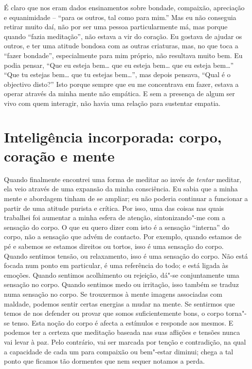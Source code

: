 É claro que nos eram dados ensinamentos sobre bondade, compaixão,
apreciação e equanimidade -- “para os outros, tal como para mim.” Mas eu
não conseguia retirar muito daí, não por ser uma pessoa particularmente
má, mas porque quando “fazia meditação”, não estava a vir do coração. Eu
gostava de ajudar os outros, e ter uma atitude bondosa com as outras
criaturas, mas, no que toca a “fazer bondade”, especialmente para mim
próprio, não resultava muito bem. Eu podia pensar, “Que eu esteja bem\ldots{}
que eu esteja bem\ldots{} que eu esteja bem\ldots{}” “Que tu estejas bem\ldots{} que tu
estejas bem\ldots{}”, mas depois pensava, “Qual é o objectivo disto?” Isto
porque sempre que eu me concentrava em fazer, estava a operar através da
minha mente não empática. E sem a presença de algum ser vivo com quem
interagir, não havia uma relação para sustentar empatia.

\section{Inteligência incorporada: corpo, coração e
mente}

Quando finalmente encontrei uma forma de meditar ao invés de
\emph{tentar} meditar, ela veio através de uma expansão da minha
consciência. Eu sabia que a minha mente e abordagem tinham de se
ampliar; eu não poderia continuar a funcionar a partir de uma atitude
purista e crítica. Por isso, uma das coisas nas quais trabalhei foi
aumentar a minha esfera de atenção, sintonizando"-me com a sensação do
corpo. O que eu quero dizer com isto é a sensação “interna” do corpo,
não a sensação que advém de contacto. Por exemplo, quando estamos de pé
e sabemos se estamos direitos ou tortos, isso é uma sensação do corpo.
Quando sentimos tensão, ou relaxamento, isso é uma sensação do corpo.
Não está focada num ponto em particular, é uma referência do todo; e
está ligada às emoções. Quando sentimos acolhimento ou rejeição, dá"-se
conjuntamente uma sensação no corpo. Quando sentimos medo ou irritação,
isso também se traduz numa sensação no corpo. Se trouxermos à mente
imagens associadas com maldade, podemos sentir certas energias a mudar
na mente. Se sentirmos que temos de nos defender ou provar que somos
suficientemente bons, o corpo torna"-se tenso. Esta noção do corpo é
afecta a estímulos e responde aos mesmos. E podemos ter a certeza que
meditação baseada nas suas aflições e tensões nunca vai levar à paz.
Pelo contrário, vai ser marcada por tenção e contradição, na qual a
capacidade de cada um para compaixão ou bem"-estar diminui; chega a tal
ponto que ficamos tão dormentes que nem sequer notamos a perda.

